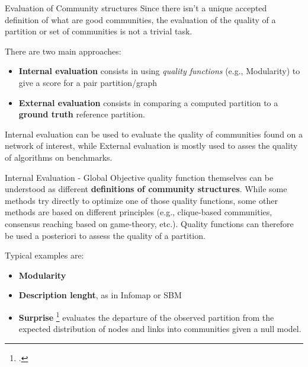 \documentclass[a4paper,11pt]{book}
\begin{document}
\begin{textbox}{Evaluation of Community structures}
Since there isn't a unique accepted definition of what are good communities, the evaluation of the quality of a partition or set of communities is not a trivial task. 

There are two main approaches:
\begin{itemize}
    \item \textbf{Internal evaluation} consists in using \textit{quality functions} (e.g., Modularity) to give a score for a pair partition/graph
    \item \textbf{External evaluation} consists in comparing a computed partition to a \textbf{ground truth} reference partition.
\end{itemize}

Internal evaluation can be used to evaluate the quality of communities found on a network of interest, while External evaluation is mostly used to asses the quality of algorithms on benchmarks. 
\end{textbox}

\begin{textbox}{Internal Evaluation - Global}
Objective quality function themselves can be understood as different \textbf{definitions of community structures}. While some methods try directly to optimize one of those quality functions, some other methods are based on different principles (e.g., clique-based communities, consensus reaching based on game-theory, etc.). Quality functions can therefore be used a posteriori to assess the quality of a partition.

Typical examples are:
\begin{itemize}
    \item \textbf{Modularity}
    \item \textbf{Description lenght}, as in Infomap or SBM
    \item \textbf{Surprise} \footcite{aldecoa2013surprise} evaluates the departure of the observed partition from the expected distribution of nodes and links into communities given a null model.
\end{itemize}

\end{textbox}
\end{document}
